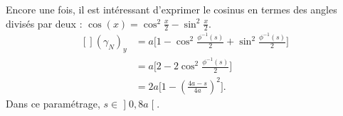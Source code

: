 \begin{example}
\begin{equation}
				\end{equation}
				Encore une fois, il est intéressant d'exprimer le cosinus en termes des angles divisés par deux : $\cos(x)=\cos^2\frac{ x }{2}-\sin^2\frac{ x }{2}$.
				\begin{equation}
					\begin{aligned}[]
						(\gamma_N)_y & =a\Big[ 1-\cos^2\frac{ \phi^{-1}(s) }{2}+\sin^2\frac{ \phi^{-1}(s) }{2} \Big] \\
						             & =a\Big[ 2-2\cos^2\frac{ \phi^{-1}(s) }{2} \Big]                               \\
						             & =2a\Big[ 1-\left( \frac{ 4a-s }{ 4a } \right)^2 \Big].
					\end{aligned}
				\end{equation}
				Dans ce paramétrage, $s\in\mathopen] 0 , 8a \mathclose[$.
\end{example}

